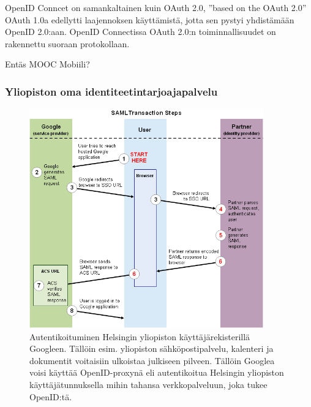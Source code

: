 \documentclass[finnish,gradu]{tktltiki}
\begin{document}
  OpenID Conncet on samankaltainen kuin OAuth 2.0, ''based on the OAuth 2.0''
  OAuth 1.0a edellytti laajennoksen käyttämistä, jotta sen pystyi yhdistämään OpenID 2.0:aan. OpenID Connectissa OAuth 2.0:n toiminnallisuudet on rakennettu suoraan protokollaan.




  Entäs MOOC Mobiili? %



  \subsubsection{Yliopiston oma identiteetintarjoajapalvelu} %
  \label{ssub:yliopiston_sähköpostit_pilveen}

    \begin{figure}[h!]
      \centering
      \includegraphics[width=0.9\textwidth]{images/google_saml_workflow_vertical.png}
      \caption{Autentikoituminen Helsingin yliopiston käyttäjärekisterillä Googleen. Tällöin esim. yliopiston sähköpostipalvelu, kalenteri ja dokumentit voitaisiin ulkoistaa julkiseen pilveen. Tällöin Googlea voisi käyttää OpenID-proxynä eli autentikoitua Helsingin yliopiston käyttäjätunnuksella mihin tahansa verkkopalveluun, joka tukee OpenID:tä.}
      \label{fig:hy_julkiseen_pilveen}
    \end{figure}
\end{document}
